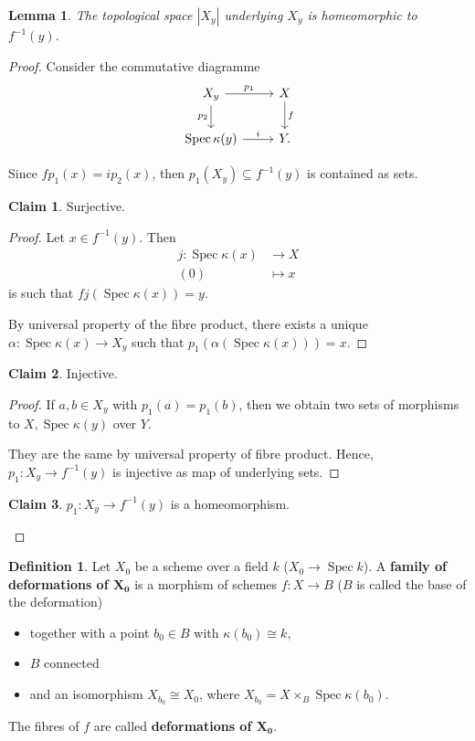 \documentclass[12pt]{article}
\DeclareMathOperator{\Spec}{Spec}
\newtheorem*{lemma}{Lemma}
\theoremstyle{definition}
\newtheorem*{definition}{Definition}
\newtheorem*{claim}{Claim}
\begin{document}
\begin{lemma}
The topological space $|X_y|$ underlying $X_y$ is homeomorphic to $f^{-1}(y)$.
\end{lemma}

\begin{proof}
Consider the commutative diagramme
\[\begin{tikzcd}X_y\arrow[r,"p_1"]\arrow[d,"p_2",swap]&X\arrow[d,"f"]\\\Spec\kappa(y)\arrow[r,"i"]&Y.\end{tikzcd}\]

Since $fp_1(x)=ip_2(x)$, then $p_1(X_y)\subseteq f^{-1}(y)$ is contained as sets.

\begin{claim}
Surjective.
\end{claim}

\begin{proof}
Let $x\in f^{-1}(y)$. Then
\begin{align*}
j:\Spec\kappa(x)&\longrightarrow X\\(0)&\longmapsto x
\end{align*}
is such that $fj(\Spec\kappa(x))=y$.

By universal property of the fibre product, there exists a unique $\alpha:\Spec\kappa(x)\rightarrow X_y$ such that $p_1(\alpha(\Spec\kappa(x)))=x$.
\end{proof}

\begin{claim}
Injective.
\end{claim}

\begin{proof}
If $a,b\in X_y$ with $p_1(a)=p_1(b)$, then we obtain two sets of morphisms to $X,\Spec\kappa(y)$ over $Y$.

They are the same by universal property of fibre product. Hence, $p_1:X_y\rightarrow f^{-1}(y)$ is injective as map of underlying sets.
\end{proof}

\begin{claim}
$p_1:X_y\rightarrow f^{-1}(y)$ is a homeomorphism.
\end{claim}
\end{proof}

\begin{definition}
Let $X_0$ be a scheme over a field $k$ ($X_0\rightarrow\Spec k$). A \textbf{family of deformations of $\boldsymbol{X_0}$} is a morphism of schemes $f:X\rightarrow B$ ($B$ is called the base of the deformation)
\begin{itemize}[label=$-$]
\item together with a point $b_0\in B$ with $\kappa(b_0)\cong k$,
\item $B$ connected
\item and an isomorphism $X_{b_0}\cong X_0$, where $X_{b_0}=X\times_B\Spec\kappa(b_0)$.
\end{itemize}
The fibres of $f$ are called \textbf{deformations of $\boldsymbol{X_0}$}.
\end{definition}
\end{document}
